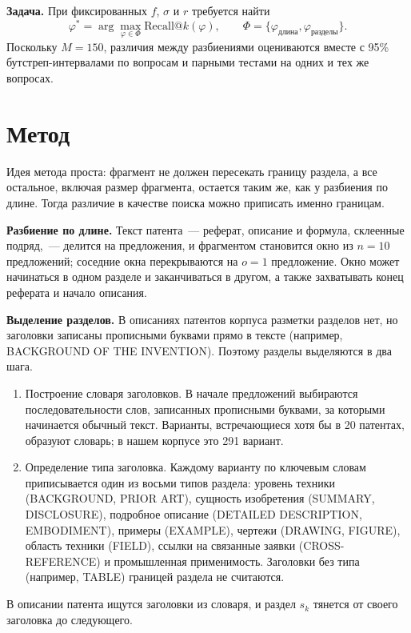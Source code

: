 \documentclass{article}
\makeatletter
\newcommand{\Rk}[1]{\mathrm{Recall@}#1}
\makeatother
\begin{document}
\textbf{Задача.} При фиксированных $f$, $\sigma$ и $r$ требуется найти
\[
    \varphi^* = \arg\max_{\varphi \in \Phi} \Rk{k}(\varphi), \qquad \Phi = \{\varphi_{\text{длина}}, \varphi_{\text{разделы}}\}.
\]
Поскольку $M = 150$, различия между разбиениями оцениваются вместе с 95\% бутстреп-интервалами по вопросам и парными тестами на одних и тех же вопросах.

\section{Метод}\label{sec:method}

Идея метода проста: фрагмент не должен пересекать границу раздела, а все остальное, включая размер фрагмента, остается таким же, как у разбиения по длине. Тогда различие в качестве поиска можно приписать именно границам.

\textbf{Разбиение по длине.} Текст патента~--- реферат, описание и формула, склеенные подряд,~--- делится на предложения, и фрагментом становится окно из $n = 10$ предложений; соседние окна перекрываются на $o = 1$ предложение. Окно может начинаться в одном разделе и заканчиваться в другом, а также захватывать конец реферата и начало описания.

\textbf{Выделение разделов.} В описаниях патентов корпуса разметки разделов нет, но заголовки записаны прописными буквами прямо в тексте (например, BACKGROUND OF THE INVENTION). Поэтому разделы выделяются в два шага.
\begin{enumerate}
    \item Построение словаря заголовков. В начале предложений выбираются последовательности слов, записанных прописными буквами, за которыми начинается обычный текст. Варианты, встречающиеся хотя бы в 20 патентах, образуют словарь; в нашем корпусе это 291 вариант.
    \item Определение типа заголовка. Каждому варианту по ключевым словам приписывается один из восьми типов раздела: уровень техники (BACKGROUND, PRIOR ART), сущность изобретения (SUMMARY, DISCLOSURE), подробное описание (DETAILED DESCRIPTION, EMBODIMENT), примеры (EXAMPLE), чертежи (DRAWING, FIGURE), область техники (FIELD), ссылки на связанные заявки (CROSS-REFERENCE) и промышленная применимость. Заголовки без типа (например, TABLE) границей раздела не считаются.
\end{enumerate}
В описании патента ищутся заголовки из словаря, и раздел $s_k$ тянется от своего заголовка до следующего.
\end{document}
